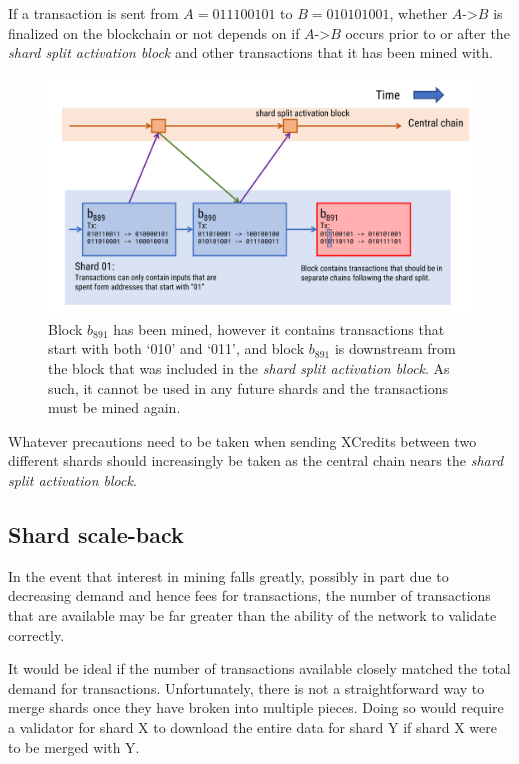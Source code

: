 \documentclass[a4paper,12pt]{article}
\begin{document}
If a transaction is sent from $A=011100101$ to $B=010101001$,  whether $A$->$B$ is finalized on the blockchain or not depends on if $A$->$B$ occurs prior to or after the \textit{shard split activation block} and other transactions that it has been mined with. 

\begin{figure}[!htb]
  \centering
  \includegraphics[page=1,width=.95\textwidth]{fork-split-problems} 
  \caption{Block $b_{891}$ has been mined, however it contains transactions that start with both `010' and `011', and block $b_{891}$ is downstream from the block that was included in the \textit{shard split activation block}. As such, it cannot be used in any future shards and the transactions must be mined again. }
  \label{fig:fork-split-problems}
\end{figure}
\FloatBarrier

Whatever precautions need to be taken when sending XCredits between two different shards should increasingly be taken as the central chain nears the \textit{shard split activation block}.  

\subsection{Shard scale-back}
In the event that interest in mining falls greatly, possibly in part due to decreasing demand and hence fees for transactions, the number of transactions that are available may be far greater than the ability of the network to validate correctly. 

It would be ideal if the number of transactions available closely matched the total demand for transactions. Unfortunately, there is not a straightforward way to merge shards once they have broken into multiple pieces. Doing so would require a validator for shard X to download the entire data for shard Y if shard X were to be merged with Y.
\end{document}
